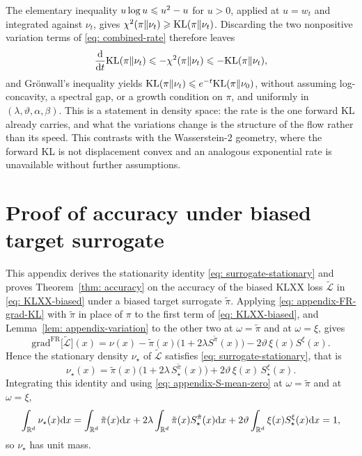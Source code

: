 \documentclass{article}
\begin{document}
The elementary inequality $u\log u\leqslant u^2-u$ for $u>0$, applied at $u=w_t$ and integrated against $\nu_t$, gives $\chi^2(\pi\|\nu_t)\geqslant\mathrm{KL}(\pi\|\nu_t)$. Discarding the two nonpositive variation terms of \eqref{eq: combined-rate} therefore leaves
\begin{equation*}
    \frac{\mathrm{d}}{\mathrm{d} t}\mathrm{KL}(\pi\|\nu_t) \leqslant -\chi^2(\pi\|\nu_t) \leqslant -\mathrm{KL}(\pi\|\nu_t) ,
\end{equation*}
and Gr\"onwall's inequality yields {\color{blue}$\mathrm{KL}(\pi\|\nu_t)\leqslant e^{-t}\mathrm{KL}(\pi\|\nu_0)$}, without assuming log-concavity, a spectral gap, or a growth condition on $\pi$, and uniformly in $(\lambda,\vartheta,\alpha,\beta)$. This is a statement in density space: the rate is the one forward KL already carries, and what the variations change is the structure of the flow rather than its speed. This contrasts with the Wasserstein-2 geometry, where the forward KL is not displacement convex and an analogous exponential rate is unavailable without further assumptions.

\section{Proof of accuracy under biased target surrogate}
\label{sec: appendix-accuracy}

This appendix derives the stationarity identity \eqref{eq: surrogate-stationary} and proves Theorem~\ref{thm: accuracy} on the accuracy of the biased KLXX loss $\tilde{\mathcal L}$ in \eqref{eq: KLXX-biased} under a biased target surrogate $\tilde\pi$. Applying \eqref{eq: appendix-FR-grad-KL} with $\tilde\pi$ in place of $\pi$ to the first term of \eqref{eq: KLXX-biased}, and Lemma~\ref{lem: appendix-variation} to the other two at $\omega=\tilde\pi$ and at $\omega=\xi$, gives
\begin{equation*}
    \mathrm{grad}^{\mathrm{FR}}\bigl[\tilde{\mathcal L}\bigr](x) = \nu(x) - \tilde\pi(x)\bigl(1+2\lambda S^{\tilde\pi}(x)\bigr) - 2\vartheta\,\xi(x)S^{\xi}(x) .
\end{equation*}
Hence the stationary density $\nu_\star$ of $\tilde{\mathcal L}$ satisfies \eqref{eq: surrogate-stationary}, that is
\begin{equation*}
	\nu_\star(x) = \tilde\pi(x)\bigl(1 + 2\lambda\,S^{\tilde\pi}_\star(x)\bigr) + 2\vartheta\,\xi(x)\,S^{\xi}_\star(x) .
\end{equation*}
Integrating this identity and using \eqref{eq: appendix-S-mean-zero} at $\omega=\tilde\pi$ and at $\omega=\xi$,
\begin{equation*}
	\int_{\mathbb R^d} \nu_\star(x)\mathrm{d} x = \int_{\mathbb R^d} \tilde\pi(x)\mathrm{d} x
	+2\lambda\int_{\mathbb R^d} \tilde\pi(x)S^{\tilde\pi}_\star(x)\mathrm{d} x +
	2\vartheta\int_{\mathbb R^d}\xi(x)S^{\xi}_\star(x)\mathrm{d} x = 1 ,
\end{equation*}
so $\nu_\star$ has unit mass.
\end{document}
